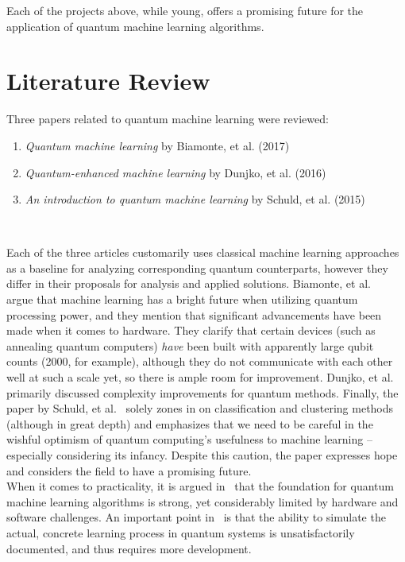 \documentclass{article}
\newcommand{\ind}{\setlength\itemindent{25pt}}
\begin{document}
  Each of the projects above, while young, offers a promising future for the application of quantum machine learning algorithms.

\section{Literature Review}
  Three papers related to quantum machine learning were reviewed:

  \begin{enumerate}
    \ind
    \item \textit{Quantum machine learning} by Biamonte, et al. (2017)
    \item \textit{Quantum-enhanced machine learning} by Dunjko, et al. (2016)
    \item \textit{An introduction to quantum machine learning} by Schuld, et al. (2015)
  \end{enumerate} \

  Each of the three articles customarily uses classical machine learning approaches as a baseline for analyzing corresponding quantum counterparts, however they differ in their proposals for analysis and applied solutions. Biamonte, et al.~\cite{biamonte} argue that machine learning has a bright future when utilizing quantum processing power, and they mention that significant advancements have been made when it comes to hardware. They clarify that certain devices (such as annealing quantum computers) \textit{have} been built with apparently large qubit counts (2000, for example), although they do not communicate with each other well at such a scale yet, so there is ample room for improvement. Dunjko, et al.~\cite{dunjko} primarily discussed complexity improvements for quantum methods. Finally, the paper by Schuld, et al.~\cite{schuld} solely zones in on classification and clustering methods (although in great depth) and emphasizes that we need to be careful in the wishful optimism of quantum computing's usefulness to machine learning -- especially considering its infancy. Despite this caution, the paper expresses hope and considers the field to have a promising future. \\

  When it comes to practicality, it is argued in~\cite{biamonte} that the foundation for quantum machine learning algorithms is strong, yet considerably limited by hardware and software challenges. An important point in~\cite{schuld} is that the ability to simulate the actual, concrete learning process in quantum systems is unsatisfactorily documented, and thus requires more development. \\
\end{document}
